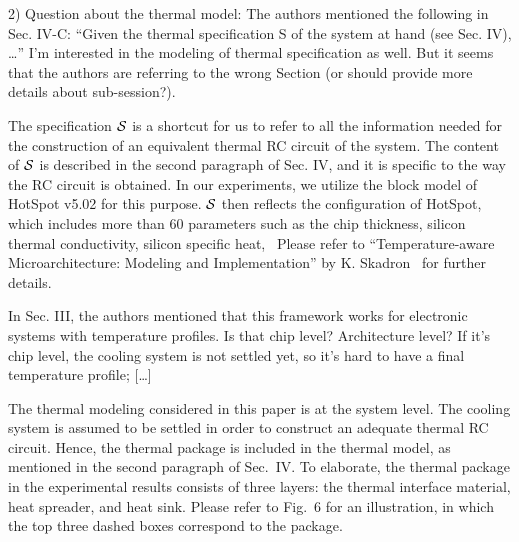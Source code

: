\begin{reviewer}
2) Question about the thermal model: The authors mentioned the following in Sec. IV-C: “Given the thermal specification S of the system at hand (see Sec. IV), …” I’m interested in the modeling of thermal specification as well. But it seems that the authors are referring to the wrong Section (or should provide more details about sub-session?).
\end{reviewer}
\begin{authors}
The specification $\mathcal{S}$ is a shortcut for us to refer to all the information needed for the construction of an equivalent thermal RC circuit of the system.
The content of $\mathcal{S}$ is described in the second paragraph of Sec. IV, and it is specific to the way the RC circuit is obtained.
In our experiments, we utilize the block model of HotSpot v5.02 for this purpose.
$\mathcal{S}$ then reflects the configuration of HotSpot, which includes more than 60 parameters such as the chip thickness, silicon thermal conductivity, silicon specific heat, \etc\ Please refer to ``Temperature-aware Microarchitecture: Modeling and Implementation'' by K. Skadron \etal\ for further details.



\end{authors}

\begin{reviewer}
In Sec. III, the authors mentioned that this framework works for electronic systems with temperature profiles. Is that chip level? Architecture level? If it’s chip level, the cooling system is not settled yet, so it’s hard to have a final temperature profile; [\ldots]
\end{reviewer}
\begin{authors}
The thermal modeling considered in this paper is at the system level.
The cooling system is assumed to be settled in order to construct an adequate thermal RC circuit.
Hence, the thermal package is included in the thermal model, as mentioned in the second paragraph of Sec.~IV.
To elaborate, the thermal package in the experimental results consists of three layers: the thermal interface material, heat spreader, and heat sink.
Please refer to Fig.~6 for an illustration, in which the top three dashed boxes correspond to the package.

\end{authors}

